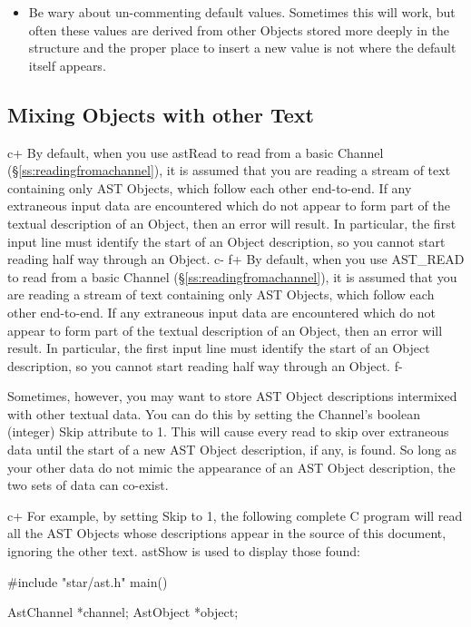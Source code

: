 \documentclass[twoside,11pt]{starlink}
\providecommand{\secref}[1]{\S\ref{#1}}
\begin{document}
{\begin{itemize}
\item Be wary about un-commenting default values. Sometimes this will
work, but often these values are derived from other Objects stored
more deeply in the structure and the proper place to insert a new
value is not where the default itself appears.
\end{itemize}

\subsection{\label{ss:mixingchanneltext}Mixing Objects with other Text}

c+
By default, when you use astRead to read from a basic Channel
(\secref{ss:readingfromachannel}), it is assumed that you are reading a
stream of text containing only AST Objects, which follow each other
end-to-end. If any extraneous input data are encountered which do not
appear to form part of the textual description of an Object, then an
error will result. In particular, the first input line must identify
the start of an Object description, so you cannot start reading half
way through an Object.
c-
f+
By default, when you use AST\_READ to read from a basic Channel
(\secref{ss:readingfromachannel}), it is assumed that you are reading a
stream of text containing only AST Objects, which follow each other
end-to-end. If any extraneous input data are encountered which do not
appear to form part of the textual description of an Object, then an
error will result. In particular, the first input line must identify
the start of an Object description, so you cannot start reading half
way through an Object.
f-

Sometimes, however, you may want to store AST Object descriptions
intermixed with other textual data. You can do this by setting the
Channel's boolean (integer) Skip attribute to 1. This will cause every
read to skip over extraneous data until the start of a new AST Object
description, if any, is found. So long as your other data do not mimic
the appearance of an AST Object description, the two sets of data can
co-exist.

c+
For example, by setting Skip to 1, the following complete C program
will read all the AST Objects whose descriptions appear in the source
of this document, ignoring the other text. astShow is used to display
those found:

\small
\begin{terminalv}
#include "star/ast.h"
main() {
   AstChannel *channel;
   AstObject *object;

}
\end{terminalv}}
\end{document}
